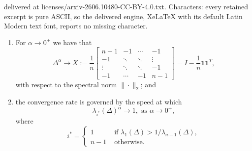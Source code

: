 \documentclass[10pt,a4paper]{amsart}
\newcommand{\fL}{\Delta^\alpha}
\begin{document}
delivered at licenses/arxiv-2606.10480-CC-BY-4.0.txt. Characters: every retained excerpt is pure ASCII, so the delivered engine, XeLaTeX with its default Latin Modern text font, reports no missing character.
\begin{lemma} \label{lemma:limit_fL_alpha_to_0}
\begin{enumerate}[label=\normalfont{(\alph*)}]
    \item For $\alpha \rightarrow 0^+$ we have that      
        \begin{equation*}
    \fL  \longrightarrow X:=\frac{1}{n}\begin{bmatrix}
             n-1 & -1 
             & \cdots &-1 \\
             -1 & \ddots & \ddots & \vdots \\
             \vdots & \ddots & \ddots  & -1 \\
             -1& \cdots& -1 & n-1
            \end{bmatrix} =  I - \frac{1}{n}\mathbf{1}\mathbf{1}^T,
               \end{equation*}
               with respect to the spectral norm $\|\cdot\|_2$; and
   \item the convergence rate is governed by the speed at which
\begin{equation*}
     \lambda_{i^*}(\Delta)^\alpha\longrightarrow 1, \text{ as } {\alpha \rightarrow 0^+},
\end{equation*}
where 
\begin{equation*}
i^* =
  \begin{cases}
    1 & \text{ if } \lambda_1(\Delta)> 1/\lambda_{n-1}(\Delta),\\
    n-1 & \text{ otherwise. }
\end{cases}  
\end{equation*}
\end{enumerate}
\end{lemma}
\end{document}

